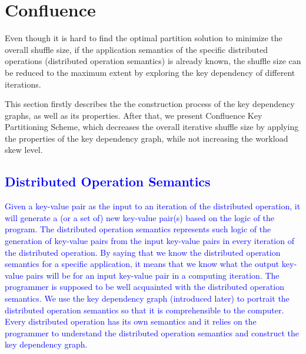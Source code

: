 \documentclass[10pt,journal,compsoc]{IEEEtran}
\newcommand{\blue}[1]{\textcolor{blue}{#1}}
\begin{document}
\section{Confluence}\label{section:keyDependencyGraph}
Even though it is hard to find the optimal partition solution to minimize the overall shuffle size,
if the application semantics of the specific distributed operations (distributed operation semantics) is already known, 
the shuffle size can be reduced to the maximum extent %
by exploring the key dependency of different iterations. 

This section firstly describes the the construction process of the key dependency graphs, as well as its properties. 
After that, we present Confluence Key Partitioning Scheme, which decreases the overall iterative shuffle size by applying the properties of the key dependency graph, while not increasing the workload skew level. 

\blue{
\subsection{Distributed Operation Semantics}\label{section:semantics}
Given a key-value pair as the input to an iteration of the distributed operation,
it will generate a (or a set of) new key-value pair(s) based on the logic of the program. 
The distributed operation semantics
represents such logic of the generation of key-value pairs from the input key-value pairs in every iteration
of the distributed operation. 
By saying that we know the distributed operation semantics for a specific application, 
it means that we know what the output key-value pairs will be 
for an input key-value pair in a computing iteration. 
The programmer is supposed to be well acquainted with the distributed operation semantics. 
We use the key dependency graph (introduced later) to portrait the distributed operation semantics
so that it is comprehensible to the computer. 
Every distributed operation has its own semantics
and it relies on the programmer to understand the distributed operation semantics 
and construct the key dependency graph.
}
\end{document}
